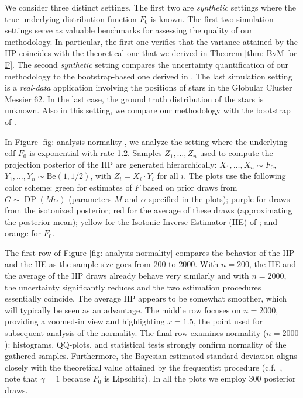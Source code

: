 We consider three distinct settings. The first two are \textit{synthetic} settings where the true underlying distribution function \( F_0 \) is known. The first two simulation settings serve as valuable benchmarks for assessing the quality of our methodology. In particular, the first one verifies that the variance attained by the IIP coincides with the theoretical one that we derived in Theorem \ref{thm: BvM for F}. The second \textit{synthetic} setting compares the uncertainty quantification of our methodology to the bootstrap-based one derived in \cite{19}. The last simulation setting is a \textit{real-data} application involving the positions of stars in the Globular Cluster Messier 62. In the last case, the ground truth distribution of the stars is unknown. Also in this setting, we compare our methodology with the bootstrap of \cite{19}. 

In Figure \ref{fig: analysis normality}, we analyze the setting where the underlying cdf \( F_0 \) is exponential with rate 1.2. Samples \( Z_1, \ldots, Z_n \) used to compute the projection posterior of the IIP are generated hierarchically: \( X_1, \ldots, X_n \sim F_0 \), \( Y_1, \ldots, Y_n \sim \mathrm{Be}(1, 1/2) \), with \( Z_i = X_i \cdot Y_i \) for all \( i \). The plots use the following color scheme: green for estimates of \( F \) based on prior draws from \( G \sim \operatorname{DP}(M \alpha) \) (parameters \( M \) and \( \alpha \) specified in the plots); purple for draws from the isotonized posterior; red for the average of these draws (approximating the posterior mean);  yellow for the Isotonic Inverse Estimator (IIE) of \cite{27}; and orange for \( F_0 \).  

The first row of Figure \ref{fig: analysis normality} compares the behavior of the IIP and the IIE as the sample size goes from 200 to 2000. With \( n = 200 \), the IIE and the average of the IIP draws already behave very similarly and with \( n = 2000 \), the uncertainty significantly reduces and the two estimation procedures essentially coincide. The average IIP appears to be somewhat smoother, which will typically be seen as an advantage. The middle row focuses on \( n = 2000 \), providing a zoomed-in view and highlighting \( x = 1.5 \), the point used for subsequent analysis of the normality. The final row examines normality (\( n = 2000 \)): histograms, QQ-plots, and statistical tests strongly confirm normality of the gathered samples. Furthermore, the Bayesian-estimated standard deviation aligns closely with the theoretical value attained by the frequentist procedure (c.f.\ \cite{27}, note that \( \gamma = 1 \) because \( F_0 \) is Lipschitz). In all the plots we employ 300 posterior draws. 
 
